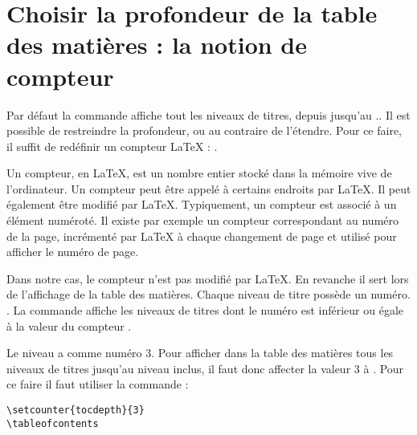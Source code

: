 \section[Choix de la profondeur]{Choisir la profondeur de la table des matières : la notion de compteur}\label{tocdepth}

Par défaut la commande  affiche tout les niveaux de titres, depuis  jusqu'au .. Il est possible de restreindre la profondeur, ou au contraire de l'étendre. Pour ce faire, il suffit de redéfinir un compteur \LaTeX{} : .

Un compteur, en \LaTeX{}, est un nombre entier stocké dans la mémoire vive de l'ordinateur. Un compteur peut être appelé à certains endroits par \LaTeX{}. Il peut également être modifié par \LaTeX{}. Typiquement, un compteur est associé à un élément numéroté. Il existe par exemple un compteur  correspondant au numéro de la page, incrémenté par \LaTeX{} à chaque changement de page et utilisé pour afficher le numéro de page. 

Dans notre cas, le compteur  n'est pas modifié par \LaTeX{}. En revanche il sert lors de l'affichage de la table des matières. Chaque niveau de titre possède un numéro. . La commande  affiche les niveaux de titres dont le numéro est inférieur ou égale à la valeur du compteur .

Le niveau  a comme numéro 3. Pour afficher dans la table des matières tous les niveaux de titres jusqu'au niveau  inclus, il faut donc affecter la valeur 3 à  . Pour ce faire il faut utiliser la commande  :

\begin{verbatim}
\setcounter{tocdepth}{3}
\tableofcontents
\end{verbatim}

